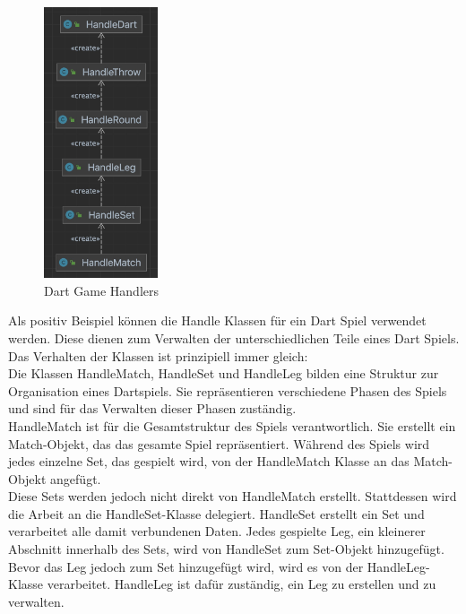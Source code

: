 \begin{figure}[ht]
    \includegraphics[width=0.3\textwidth]{Bilder/handleDiagram.png}
    \caption{Dart Game Handlers}
    \label{fig:dart-handlers}
\end{figure}
Als positiv Beispiel können die Handle Klassen für ein Dart Spiel verwendet werden. Diese dienen zum Verwalten der unterschiedlichen Teile eines Dart Spiels. Das Verhalten der Klassen ist prinzipiell immer gleich:\\
Die Klassen HandleMatch, HandleSet und HandleLeg bilden eine Struktur zur Organisation eines Dartspiels. Sie repräsentieren verschiedene Phasen des Spiels und sind für das Verwalten dieser Phasen zuständig.\\

HandleMatch ist für die Gesamtstruktur des Spiels verantwortlich. Sie erstellt ein Match-Objekt, das das gesamte Spiel repräsentiert. Während des Spiels wird jedes einzelne Set, das gespielt wird, von der HandleMatch Klasse an das Match-Objekt angefügt.\\

Diese Sets werden jedoch nicht direkt von HandleMatch erstellt. Stattdessen wird die Arbeit an die HandleSet-Klasse delegiert. HandleSet erstellt ein Set und verarbeitet alle damit verbundenen Daten. Jedes gespielte Leg, ein kleinerer Abschnitt innerhalb des Sets, wird von HandleSet zum Set-Objekt hinzugefügt.\\

Bevor das Leg jedoch zum Set hinzugefügt wird, wird es von der HandleLeg-Klasse verarbeitet. HandleLeg ist dafür zuständig, ein Leg zu erstellen und zu verwalten.\\

